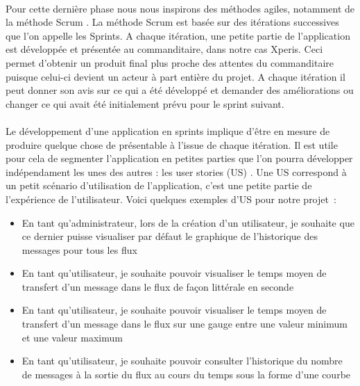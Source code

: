 			\paragraph{}%
			Pour cette dernière phase nous nous inspirons des méthodes agiles, notamment
			de la méthode Scrum \citep{aubry_scrum_2015}. La méthode Scrum est basée sur
			des itérations successives que l'on appelle les Sprints. A chaque itération, une petite
			partie de l'application est développée et présentée au commanditaire, dans
			notre cas Xperis.
			Ceci permet d'obtenir un produit final plus proche des attentes
			du commanditaire puisque celui-ci devient un acteur à part entière du
			projet. A chaque itération il peut donner son avis sur ce qui a été
			développé et demander des améliorations ou changer ce qui avait été
			initialement prévu pour le sprint suivant.
			
			\paragraph{}%
			Le développement d'une application en sprints implique d'être en mesure de
			produire quelque chose de présentable à l'issue de chaque itération.
			Il est utile pour cela de segmenter l'application en petites parties que
			l'on pourra développer indépendament les unes des autres : les user stories
			(US) \citep{aubry_scrum_2015}.
			Une US correspond à un petit scénario d'utilisation de
			l'application, c'est une petite partie de l'expérience de l'utilisateur.
			Voici quelques exemples d'US pour notre projet~:
			\begin{itemize}
			  \item En tant qu'administrateur, lors de la création d'un utilisateur, je
			  souhaite que ce dernier puisse visualiser par défaut le graphique de
			  l'historique des messages pour tous les flux
			  \item En tant qu'utilisateur, je souhaite pouvoir visualiser le temps moyen
			  de transfert d'un message dans le flux de façon littérale en seconde
			  \item En tant qu'utilisateur, je souhaite pouvoir visualiser le temps
			  moyen de transfert d'un message dans le flux sur une gauge entre une
			  valeur minimum et une valeur maximum
			  \item En tant qu'utilisateur, je souhaite pouvoir consulter l'historique du
			  nombre de messages à la sortie du flux au cours du temps sous la forme
			  d'une courbe
			\end{itemize}
			
